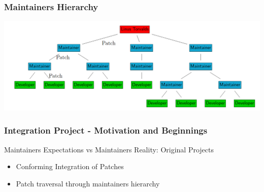 \documentclass{beamer}
\begin{document}
	

	\begin{frame}
	\frametitle{Maintainers Hierarchy}
     		\includegraphics[width=1.0\textwidth]{pics/maintainers_hierarchy.png}
	\end{frame}



	\begin{frame}
	\frametitle{Integration Project - Motivation and Beginnings}
		\begin{block}{Maintainers Expectations vs Maintainers Reality: Original Projects}
			\begin{itemize}
				\item Conforming Integration of Patches
				\item Patch traversal through maintainers hierarchy
			\end{itemize}
		\end{block}
	\end{frame}


\end{document}
